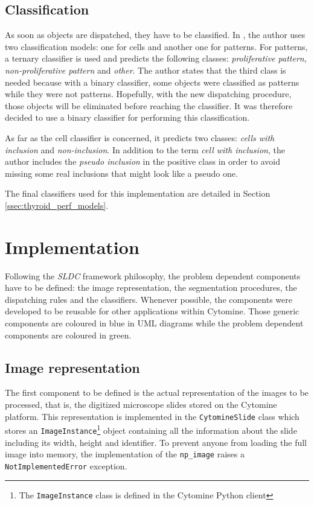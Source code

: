 \subsection{Classification}

As soon as objects are dispatched, they have to be classified. In \cite{adeblire2013}, the author uses two classification models: one for cells and another one for patterns. For patterns, a ternary classifier is used and predicts the following classes: \textit{proliferative pattern}, \textit{non-proliferative pattern} and \textit{other}. The author states that the third class is needed because with a binary classifier, some objects were classified as patterns while they were not patterns. Hopefully, with the new dispatching procedure, those objects will be eliminated before reaching the classifier. It was therefore decided to use a binary classifier for performing this classification. 

As far as the cell classifier is concerned, it predicts two classes: \textit{cells with inclusion} and \textit{non-inclusion}. In addition to the term \textit{cell with inclusion}, the author includes the \textit{pseudo inclusion} in the positive class in order to avoid missing some real inclusions that might look like a pseudo one. 

The final classifiers used for this implementation are detailed in Section \ref{ssec:thyroid_perf_models}.

\section{Implementation}
\label{sec:thyroid_implementation}
Following the \textit{SLDC} framework philosophy, the problem dependent components have to be defined: the image representation, the segmentation procedures, the dispatching rules and the classifiers. Whenever possible, the components were developed to be reusable for other applications within Cytomine. Those generic components are coloured in blue in UML diagrams while the problem dependent components are coloured in green.

\subsection{Image representation}

The first component to be defined is the actual representation of the images to be processed, that is, the digitized microscope slides stored on the Cytomine platform. This representation is implemented in the \texttt{CytomineSlide} class which stores an \texttt{ImageInstance}\footnote{The \texttt{ImageInstance} class is defined in the Cytomine Python client} object containing all the information about the slide including its width, height and identifier. To prevent anyone from loading the full image into memory, the implementation of the \texttt{np\_image} raises a \texttt{NotImplementedError} exception. 


